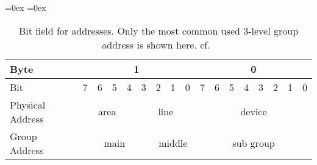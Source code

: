 
\begin{table}
	\aboverulesep=0ex
	\belowrulesep=0ex
	\renewcommand{\arraystretch}{1.2}
	
	\centering
	\begin{tabular}{|l|c|c|c|c|c|c|c|c|c|c|c|c|c|c|c|c|}
		\toprule
		Byte & \multicolumn{8}{c|}{1} & \multicolumn{8}{c|}{0} \\\midrule
		Bit & 7 & 6 & 5 & 4 & 3 & 2 & 1 & 0 & 7 & 6 & 5 & 4 & 3 & 2 & 1 & 0\\\midrule
		Physical Address & \multicolumn{4}{c|}{area} & \multicolumn{4}{c|}{line} & \multicolumn{8}{c|}{device}\\\midrule
		Group Address & \multicolumn{5}{c|}{main} & \multicolumn{3}{c|}{middle} & \multicolumn{8}{c|}{sub group}\\
		\bottomrule
	\end{tabular}
	\caption[Bit field for \knx addresses]{Bit field for \knx addresses. Only the most common used 3-level group address is shown here. cf.~\textcite{Merz2009,Sokollik2017} }
	\label{tab:background:bas:knx:topo:addr}
\end{table}